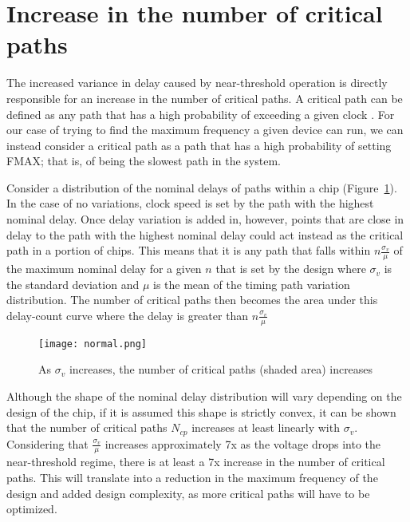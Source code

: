\section{Increase in the number of critical paths}
\label{sec:criticalpaths}

The increased variance in delay caused by near-threshold operation is directly responsible for an increase in the number of critical paths.
A critical path can be defined as any path that has a high probability of exceeding a given clock \cite{Wang:2004bw}.
For our case of trying to find the maximum frequency a given device can run, we can instead consider a critical path as a path that has a high probability of setting FMAX; that is, of being the slowest path in the system.
  
Consider a distribution of the nominal delays of paths within a chip (Figure~\ref{fig:normal}).
In the case of no variations, clock speed is set by the path with the highest nominal delay.
Once delay variation is added in, however, points that are close in delay to the path with the highest nominal delay could act instead as the critical path in a portion of chips.
This means that it is any path that falls within $n\frac{\sigma_v}{\mu}$ of the maximum nominal delay for a given $n$ that is set by the design where $\sigma_v$ is the standard deviation and $\mu$ is the mean of the timing path variation distribution.
The number of critical paths then becomes the area under this delay-count curve where the delay is greater than $n\frac{\sigma_v}{\mu}$
 
\begin{figure}[thpb]
    \centering
    \texttt{[image: normal.png]}
    \caption{As $\sigma_v$ increases, the number of critical paths (shaded area) increases}
    \label{fig:normal}
\end{figure}
 
 Although the shape of the nominal delay distribution will vary depending on the design of the chip, if it is assumed this shape is strictly convex, it can be shown that the number of critical paths $N_{cp}$ increases at least linearly with $\sigma_v$.
Considering that $\frac{\sigma_v}{\mu}$ increases approximately 7x as the voltage drops into the near-threshold regime, there is at least a 7x increase in the number of critical paths.
This will translate into a reduction in the maximum frequency of the design\cite{Bowman:2002cp} and added design complexity, as more critical paths will have to be optimized.

